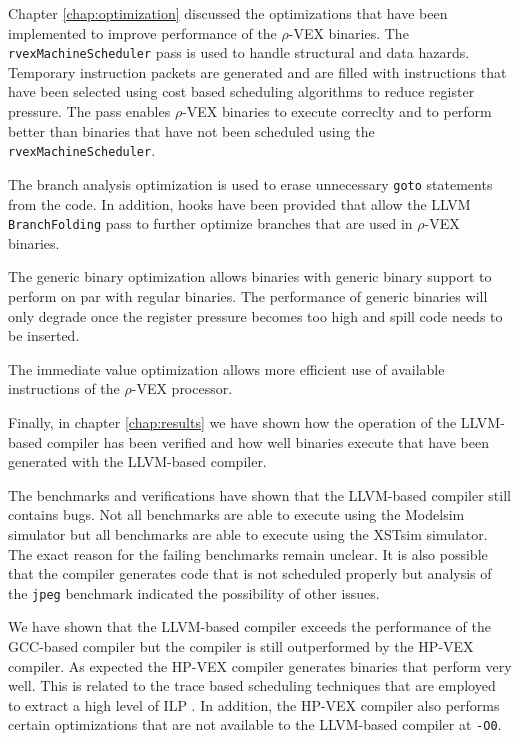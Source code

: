 Chapter \ref{chap:optimization} discussed the optimizations that have been implemented to improve performance of the $\rho$-VEX binaries. The \texttt{rvexMachineScheduler} pass is used to handle structural and data hazards. Temporary instruction packets are generated and are filled with instructions that have been selected using cost based scheduling algorithms to reduce register pressure. The pass enables $\rho$-VEX binaries to execute correclty and to perform better than binaries that have not been scheduled using the \texttt{rvexMachineScheduler}.

The branch analysis optimization is used to erase unnecessary \texttt{goto} statements from the code. In addition, hooks have been provided that allow the LLVM \texttt{BranchFolding} pass to further optimize branches that are used in $\rho$-VEX binaries.

The generic binary optimization allows binaries with generic binary support to perform on par with regular binaries. The performance of generic binaries will only degrade once the register pressure becomes too high and spill code needs to be inserted.

The immediate value optimization allows more efficient use of available instructions of the  $\rho$-VEX processor.

Finally, in chapter \ref{chap:results} we have shown how the operation of the LLVM-based compiler has been verified and how well binaries execute that have been generated with the LLVM-based compiler.

The benchmarks and verifications have shown that the LLVM-based compiler still contains bugs. Not all benchmarks are able to execute using the Modelsim simulator but all benchmarks are able to execute using the XSTsim simulator. The exact reason for the failing benchmarks remain unclear. It is also possible that the compiler generates code that is not scheduled properly but analysis of the \texttt{jpeg} benchmark indicated the possibility of other issues. 

We have shown that the LLVM-based compiler exceeds the performance of the GCC-based compiler but the compiler is still outperformed by the HP-VEX compiler. As expected the HP-VEX compiler generates binaries that perform very well. This is related to the trace based scheduling techniques that are employed to extract a high level of ILP \cite{Lowney:1993qy}. In addition, the HP-VEX compiler also performs certain optimizations that are not available to the LLVM-based compiler at \texttt{-O0}.

